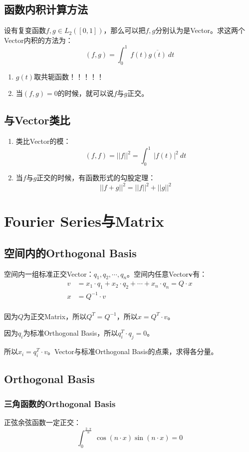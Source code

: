 \subsection{函数内积计算方法}
设有复变函数$f,g\in L_2([0,1])$，那么可以把$f,g$分别认为是Vector。求这两个Vector内积的方法为：
\begin{equation}
	(f,g)=\int_0^1\ f(t)\overline{g(t)}\ dt
\end{equation}
\begin{enumerate}
	\item $g(t)​$取共轭函数！！！！！
	\item 当$(f,g)=0$的时候，就可以说$f$与$g​$正交。
\end{enumerate}
\subsection{与Vector类比}
\begin{enumerate}
	\item 类比Vector的模：
	      $$
		      (f,f)=||f||^2=\int_0^1\ |f(t)|^2 \ dt
	      $$
	\item 当$f$与$g​$正交的时候，有函数形式的勾股定理：
	      $$
		      ||f+g||^2=||f||^2+||g||^2
	      $$
\end{enumerate}
\section{Fourier Series与Matrix}
\subsection{空间内的Orthogonal Basis}
空间内一组标准正交Vector：$q_1,q_2,\cdots ,q_n$。空间内任意Vector$\mathbf{v}$有：
\begin{align*}
	v & =x_1\cdot q_1+x_2\cdot q_2+\cdots+x_n\cdot q_n=Q\cdot x \\
	x & =Q^{-1}\cdot v                                          \\
\end{align*}

因为$Q$为正交Matrix，所以$Q^T=Q^{-1}$，所以$x=Q^T\cdot v$。

因为$q_i$为标准Orthogonal Basis，所以$q_i^T\cdot q_j=0$。

所以$x_i=q_i^T\cdot v$。Vector与标准Orthogonal Basis的点乘，求得各分量。
\subsection{Orthogonal Basis}
\subsubsection{三角函数的Orthogonal Basis}
正弦余弦函数一定正交：
$$
	\int_0^{\frac{2\cdot \pi}{n}}\ \cos(n\cdot x)\sin(n\cdot x)=0
$$

